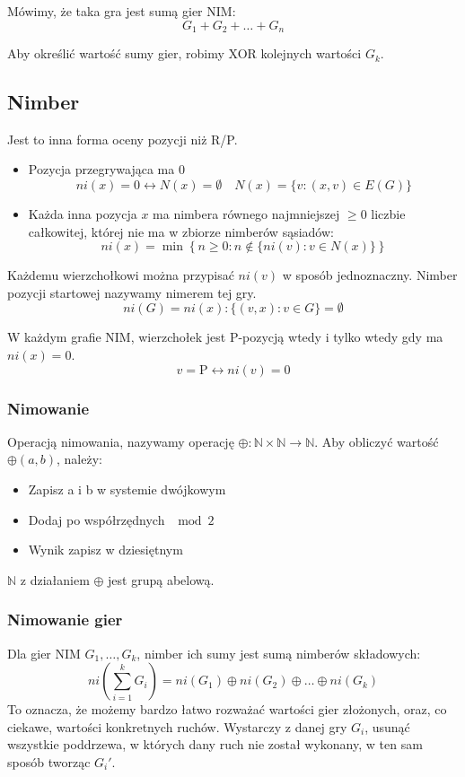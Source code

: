 \documentclass{../notatki}
\begin{document}
Mówimy, że taka gra jest sumą gier NIM:
$$
G_1 + G_2 + \dots + G_n
$$

Aby określić wartość sumy gier, robimy XOR kolejnych wartości $G_k$.

\subsection{Nimber}

Jest to inna forma oceny pozycji niż R/P.
\begin{itemize}
  \item Pozycja przegrywająca ma 0
    $$
    ni(x) = 0 \leftrightarrow N(x) = \emptyset \quad N(x) = \{v : (x,
    v) \in E(G)\}
    $$
  \item Każda inna pozycja $x$ ma nimbera równego najmniejszej $\geq 0$
    liczbie całkowitej, której nie ma w zbiorze nimberów sąsiadów:
    $$
    ni(x) = \min \left\{ n \geq 0 : n \notin \{ ni(v) : v \in N(x) \} \right\}
    $$
\end{itemize}
Każdemu wierzchołkowi można przypisać $ni(v)$ w sposób jednoznaczny. Nimber
pozycji startowej nazywamy nimerem tej gry.
$$
ni(G) = ni(x) : \{(v, x) : v \in G\} = \emptyset
$$

W każdym grafie NIM, wierzchołek jest P-pozycją wtedy i tylko wtedy
gdy ma $ni(x) = 0$.
$$
v = \mathrm{P} \leftrightarrow ni(v) = 0
$$

\subsubsection{Nimowanie}

Operacją nimowania, nazywamy operację $\oplus: \mathbb{N} \times
\mathbb{N} \to \mathbb{N}$. Aby obliczyć wartość $\oplus(a, b)$, należy:
\begin{itemize}
  \item Zapisz a i b w systemie dwójkowym
  \item Dodaj po współrzędnych $\mod 2$
  \item Wynik zapisz w dziesiętnym
\end{itemize}
$\mathbb{N}$ z działaniem $\oplus$ jest grupą abelową.

\subsubsection{Nimowanie gier}

Dla gier NIM $G_1, \dots, G_k$, nimber ich sumy jest sumą nimberów składowych:
$$
ni\left(\sum_{i = 1}^k G_i\right) = ni(G_1) \oplus ni(G_2) \oplus
\dots \oplus ni(G_k)
$$
To oznacza, że możemy bardzo łatwo rozważać wartości gier złożonych, oraz, co
ciekawe, wartości konkretnych ruchów. Wystarczy z danej gry $G_i$, usunąć
wszystkie poddrzewa, w których dany ruch nie został wykonany, w ten sam sposób
tworząc $G_i'$.
\end{document}
